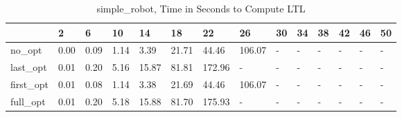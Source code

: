 \begin{table}
\caption{simple_robot, Time in Seconds to Compute LTL}
\label{simple_robot_LTL_time}
\begin{tabular}{llllllllllllll}
\toprule
 & 2 & 6 & 10 & 14 & 18 & 22 & 26 & 30 & 34 & 38 & 42 & 46 & 50 \\
\midrule
no_opt & 0.00 & 0.09 & 1.14 & 3.39 & 21.71 & 44.46 & 106.07 & - & - & - & - & - & - \\
last_opt & 0.01 & 0.20 & 5.16 & 15.87 & 81.81 & 172.96 & - & - & - & - & - & - & - \\
first_opt & 0.01 & 0.08 & 1.14 & 3.38 & 21.69 & 44.46 & 106.07 & - & - & - & - & - & - \\
full_opt & 0.01 & 0.20 & 5.18 & 15.88 & 81.70 & 175.93 & - & - & - & - & - & - & - \\
\bottomrule
\end{tabular}
\end{table}
